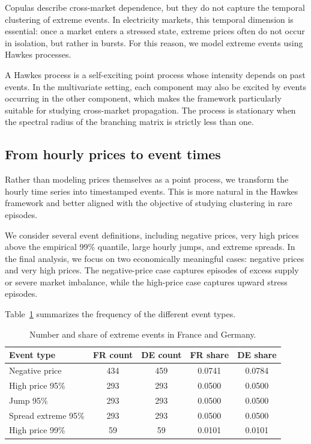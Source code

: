 Copulas describe cross-market dependence, but they do not capture the temporal clustering of extreme events. In electricity markets, this temporal dimension is essential: once a market enters a stressed state, extreme prices often do not occur in isolation, but rather in bursts. For this reason, we model extreme events using Hawkes processes.

A Hawkes process is a self-exciting point process whose intensity depends on past events. In the multivariate setting, each component may also be excited by events occurring in the other component, which makes the framework particularly suitable for studying cross-market propagation. The process is stationary when the spectral radius of the branching matrix is strictly less than one.

\subsection{From hourly prices to event times}

Rather than modeling prices themselves as a point process, we transform the hourly time series into timestamped events. This is more natural in the Hawkes framework and better aligned with the objective of studying clustering in rare episodes.

We consider several event definitions, including negative prices, very high prices above the empirical 99\% quantile, large hourly jumps, and extreme spreads. In the final analysis, we focus on two economically meaningful cases: negative prices and very high prices. The negative-price case captures episodes of excess supply or severe market imbalance, while the high-price case captures upward stress episodes.

Table~\ref{tab:hawkes_event_counts} summarizes the frequency of the different event types.

\begin{table}[H]
\centering
\caption{Number and share of extreme events in France and Germany.}
\label{tab:hawkes_event_counts}
\begin{tabular}{lcccc}
\toprule
Event type & FR count & DE count & FR share & DE share \\
\midrule
Negative price      & 434 & 459 & 0.0741 & 0.0784 \\
High price 95\%     & 293 & 293 & 0.0500 & 0.0500 \\
Jump 95\%           & 293 & 293 & 0.0500 & 0.0500 \\
Spread extreme 95\% & 293 & 293 & 0.0500 & 0.0500 \\
High price 99\%     & 59  & 59  & 0.0101 & 0.0101 \\
\bottomrule
\end{tabular}
\end{table}

